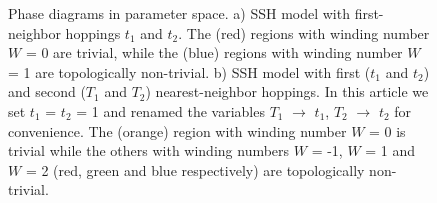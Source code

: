 \documentclass[10pt]{revtex4-1}
\begin{document}
\begin{figure}
\centering
{}\quad
{}
\caption{Phase diagrams in parameter space. a) SSH model with first-neighbor hoppings $t_1$ and $t_2$. The (red) regions with winding number $W$ = 0 are trivial, while the (blue) regions with winding number $W$ = 1 are topologically non-trivial. b) SSH model with first ($t_1$ and $t_2$) and second ($T_1$ and $T_2$) nearest-neighbor hoppings. In this article we set $t_1$ = $t_2$ = 1 and renamed the variables $T_1$ $\rightarrow$ $t_1$, $T_2$ $\rightarrow$ $t_2$ for convenience. The (orange) region with winding number $W$ = 0 is trivial while the others with winding numbers $W$ = -1, $W$ = 1 and $W$ = 2 (red, green and blue respectively) are topologically non-trivial.}
\label{fig:phasediagrams}
\end{figure}
\end{document}
